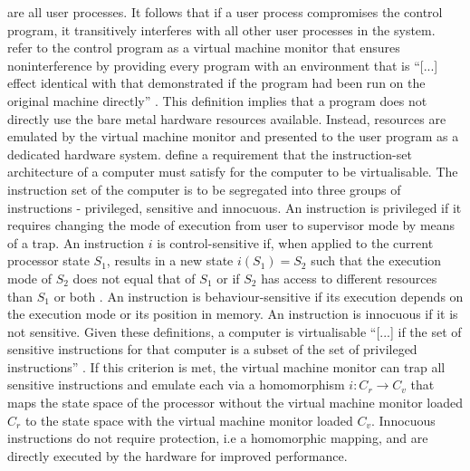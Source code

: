 are all user processes. It follows that if a user process compromises the control 
program, it transitively interferes with all other user processes in the system.\\
\textcite{10.1145/361011.361073} refer to the control program as a virtual machine monitor that 
ensures noninterference by providing every program with an environment that is \enquote{[...] effect
identical with that demonstrated if the program had been run on the original machine directly} 
\cite[2]{10.1145/361011.361073}. 
This definition implies that a program does not directly use the bare metal hardware resources 
available. Instead, resources are emulated by the virtual machine monitor and presented to the 
user program as a dedicated hardware system. 
\textcite{10.1145/361011.361073} define a requirement that the instruction-set architecture 
of a computer must satisfy for the computer to be virtualisable. 
The instruction set of the computer is to be segregated into three groups of instructions - privileged, sensitive 
and innocuous. An instruction is privileged if it requires changing the mode of execution from user 
to supervisor mode by means of a trap.
An instruction $i$ is control-sensitive if, when applied to the current processor state $S_1$, 
results in a new state $i(S_{1}) = S_{2}$ such that the execution mode of $S_{2}$ does not equal 
that of $S_{1}$ or if $S_{2}$ has access to different resources than $S_1$ or both 
\cite{10.1145/361011.361073}. An instruction is behaviour-sensitive if its execution depends on the 
execution mode or its position in memory. An instruction is innocuous if it is not sensitive. 
Given these definitions, a computer is virtualisable \enquote{[...] if the set of sensitive instructions
for that computer is a subset of the set of privileged instructions} \cite[6]{10.1145/361011.361073}.
If this criterion is met, the virtual machine monitor can trap all sensitive instructions and 
emulate each via a homomorphism $i: C_{r} \rightarrow C_{v}$ that maps the state space of the 
processor without the virtual machine monitor loaded $C_{r}$ to the state space with the 
virtual machine monitor loaded $C_{v}$. 
Innocuous instructions do not require protection, i.e a homomorphic mapping, and are 
directly executed by the hardware for improved performance. 

